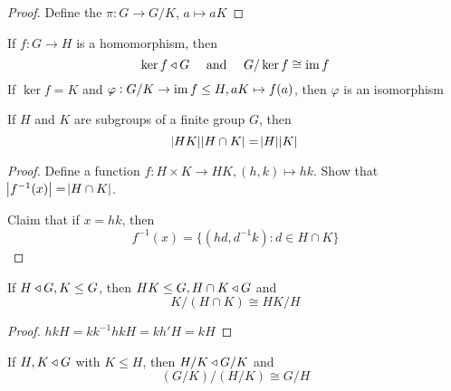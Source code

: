\documentclass[11pt]{article}
\begin{document}
\begin{proof}
Define the  \(\pi:G\to G/K\), \(a\mapsto aK\)
\end{proof}

\begin{theorem}
If \(f:G\to H\) is a homomorphism, then
\begin{equation*}
\operatorname{ker} f\triangleleft G\quad\text{ and }\quad G/\operatorname{ker} f\cong\operatorname{im} f
\end{equation*}
If \(\ker f=K\) and \(\varphi:G/K\to\operatorname{im} f\le H,aK\mapsto f(a)\), then \(\varphi\)
is an isomorphism
\end{theorem}

\quad
{}

\begin{proposition}
If \(H\) and \(K\) are subgroups of a finite group \(G\), then
\begin{equation*}
\abs{HK}\abs{H\cap K}=\abs{H}\abs{K}
\end{equation*}
\end{proposition}

\begin{proof}
Define a function \(f:H\times K\to HK,(h,k)\mapsto hk\). Show that
\(\abs{f^{-1}(x)}=\abs{H\cap K}\). 

Claim that if \(x=hk\), then
\begin{equation*}
f^{-1}(x)=\{(hd,d^{-1}k):d\in H\cap K\}
\end{equation*}
\end{proof}

\begin{theorem}
If \(H\triangleleft G, K\le G\), then \(HK\le G,H\cap K\triangleleft G\) and
\begin{equation*}
K/(H\cap K)\cong HK/H
\end{equation*}
\end{theorem}

\begin{proof}
\(hkH=kk^{-1}hkH=kh'H=kH\)
\end{proof}

\begin{theorem}
If \(H,K\triangleleft G\) with \(K\le H\), then \(H/K\triangleleft G/K\) and
\begin{equation*}
(G/K)/(H/K)\cong G/H
\end{equation*}
\end{theorem}
\end{document}
